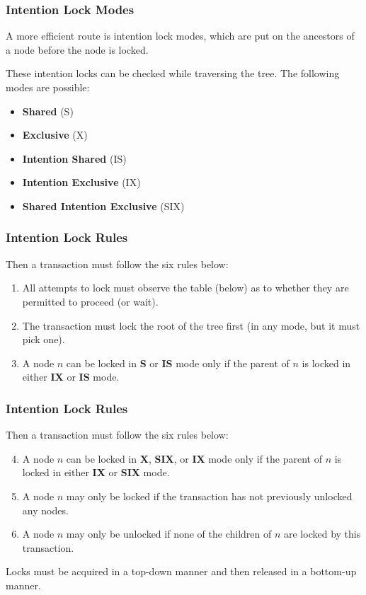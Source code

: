 \begin{frame}
\frametitle{Intention Lock Modes}

A more efficient route is \alert{intention lock modes}, which are put on the ancestors of a node before the node is locked.

These intention locks can be checked while traversing the tree. The following modes are possible:

\begin{itemize}
	\item \textbf{Shared} (S)
	\item \textbf{Exclusive} (X) 
	\item \textbf{Intention Shared} (IS) 
	\item \textbf{Intention Exclusive} (IX) 
	\item \textbf{Shared Intention Exclusive} (SIX)
\end{itemize} 


\end{frame}

\begin{frame}
\frametitle{Intention Lock Rules}

Then a transaction must follow the six rules below:

\begin{enumerate}
	\item All attempts to lock must observe the table (below) as to whether they are permitted to proceed (or wait).
	\item The transaction must lock the root of the tree first (in any mode, but it must pick one).
	\item A node $n$ can be locked in \textbf{S} or \textbf{IS} mode only if the parent of $n$ is locked in either \textbf{IX} or \textbf{IS} mode.
\end{enumerate}
	
\end{frame}

\begin{frame}
\frametitle{Intention Lock Rules}

Then a transaction must follow the six rules below:

\begin{enumerate}	
 \setcounter{enumi}{3}
	\item A node $n$ can be locked in \textbf{X}, \textbf{SIX}, or \textbf{IX} mode only if the parent of $n$ is locked in either \textbf{IX} or \textbf{SIX} mode.
	\item A node $n$ may only be locked if the transaction has not previously unlocked any nodes.
	\item A node $n$ may only be unlocked if none of the children of $n$ are locked by this transaction.
\end{enumerate}

Locks must be acquired in a top-down manner and then released in a bottom-up manner. 

\end{frame}

